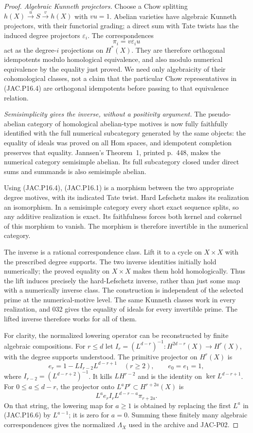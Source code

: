 \documentclass[11pt,a4paper]{article}
\begin{document}
\begin{proof}
\emph{Algebraic Kunneth projectors.}
Choose a Chow splitting $h(X)\xrightarrow{u}S\xrightarrow{v}h(X)$
with $vu=1$. Abelian varieties have algebraic Kunneth projectors,
with their functorial grading; a direct sum with Tate twists has
the induced degree projectors $\varepsilon_i$. The correspondences
\[
                         \pi_i=v\varepsilon_i u          \tag{JAC.P16.4}
\]
act as the degree-$i$ projections on $H^*(X)$. They are therefore
orthogonal idempotents modulo homological equivalence, and also
modulo numerical equivalence by the equality just proved. We
need only algebraicity of their cohomological classes, not a claim
that the particular Chow representatives in (JAC.P16.4) are
orthogonal idempotents before passing to that equivalence relation.

\emph{Semisimplicity gives the inverse, without a positivity argument.}
The pseudo-abelian category of homological abelian-type motives
is now fully faithfully identified with the full numerical
subcategory generated by the same objects: the equality of ideals
was proved on all Hom spaces, and idempotent completion preserves
that equality. Jannsen's Theorem~1, printed p.~448, makes the
numerical category semisimple abelian. Its full subcategory closed
under direct sums and summands is also semisimple abelian.

Using (JAC.P16.4), (JAC.P16.1) is a morphism between the two
appropriate degree motives, with its indicated Tate twist.
Hard Lefschetz makes its realization an isomorphism. In a
semisimple category every short exact sequence splits, so any
additive realization is exact. Its faithfulness forces both kernel
and cokernel of this morphism to vanish. The morphism is therefore
invertible in the numerical category.

The inverse is a rational correspondence class. Lift it to a
cycle on $X\times X$ with the prescribed degree supports. The
two inverse identities initially hold numerically; the proved
equality on $X\times X$ makes them hold homologically. Thus the
lift induces precisely the hard-Lefschetz inverse, rather than
just some map with a numerically inverse class.
The construction is independent of the selected prime at the
numerical-motive level. The same Kunneth classes work in every
realization, and 032 gives the equality of ideals for every
invertible prime. The lifted inverse therefore works for all of
them.

For clarity, the normalized lowering operator can be reconstructed
by finite algebraic compositions. For $r\le d$ let
$I_r=(L^{d-r})^{-1}:H^{2d-r}(X)\to H^r(X)$, with the degree
supports understood. The primitive projector on $H^r(X)$ is
\[
 e_r=1-L I_{r-2}L^{d-r+1}\quad(r\ge2),
 \qquad e_0=e_1=1,                                     \tag{JAC.P16.5}
\]
where $I_{r-2}=(L^{d-r+2})^{-1}$.
It kills $LH^{r-2}$ and is the identity on
$\ker L^{d-r+1}$. For $0\le a\le d-r$, the projector onto
$L^aP^r\subset H^{r+2a}(X)$ is
\[
             L^a e_r I_r L^{d-r-a}\pi_{r+2a}.           \tag{JAC.P16.6}
\]
On that string, the lowering map for $a\ge1$ is obtained by
replacing the first $L^a$ in (JAC.P16.6) by $L^{a-1}$; it is
zero for $a=0$. Summing these finitely many algebraic
correspondences gives the normalized $\Lambda_X$ used in the
archive and JAC-P02.


\end{proof}
\end{document}
